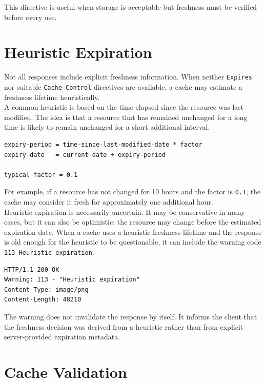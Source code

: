 \documentclass{scrbook}
\begin{document}
This directive is useful when storage is acceptable but freshness must be verified before every use.

\section{Heuristic Expiration}

Not all responses include explicit freshness information. When neither \texttt{Expires} nor suitable \texttt{Cache-Control} directives are available, a cache may estimate a freshness lifetime heuristically.\\

A common heuristic is based on the time elapsed since the resource was last modified. The idea is that a resource that has remained unchanged for a long time is likely to remain unchanged for a short additional interval.

\begin{lstlisting}
expiry-period = time-since-last-modified-date * factor
expiry-date   = current-date + expiry-period

typical factor = 0.1
\end{lstlisting}

For example, if a resource has not changed for 10 hours and the factor is \texttt{0.1}, the cache may consider it fresh for approximately one additional hour.\\

Heuristic expiration is necessarily uncertain. It may be conservative in many cases, but it can also be optimistic: the resource may change before the estimated expiration date. When a cache uses a heuristic freshness lifetime and the response is old enough for the heuristic to be questionable, it can include the warning code \texttt{113 Heuristic expiration}.

\begin{lstlisting}
HTTP/1.1 200 OK
Warning: 113 - "Heuristic expiration"
Content-Type: image/png
Content-Length: 48210
\end{lstlisting}

The warning does not invalidate the response by itself. It informs the client that the freshness decision was derived from a heuristic rather than from explicit server-provided expiration metadata.

\section{Cache Validation}
\end{document}
